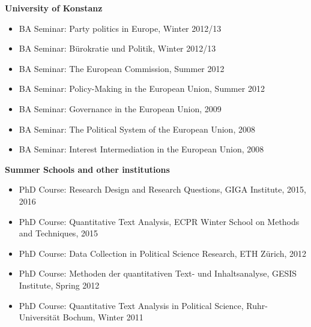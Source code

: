 \textbf{University of Konstanz}
\begin{itemize}[topsep=0pt, noitemsep, leftmargin=3]
	\item BA Seminar: Party politics in Europe, Winter 2012/13
	\item BA Seminar: Bürokratie und Politik, Winter 2012/13
	\item BA Seminar: The European Commission, Summer 2012
	\item BA Seminar: Policy-Making in the European Union, Summer 2012
	\item BA Seminar: Governance in the European Union, 2009
	\item BA Seminar: The Political System of the European Union, 2008
	\item BA Seminar: Interest Intermediation in the European Union, 2008
\end{itemize}

\vspace{\baselineskip}

\textbf{Summer Schools and other institutions}
\begin{itemize}[topsep=0pt, noitemsep, leftmargin=3]
	\item PhD Course: Research Design and Research Questions, GIGA Institute, 2015, 2016
	\item PhD Course: Quantitative Text Analysis, ECPR Winter School on Methods and Techniques, 2015
	\item PhD Course: Data Collection in Political Science Research, ETH Zürich, 2012
	\item PhD Course: Methoden der quantitativen Text- und Inhaltsanalyse, GESIS Institute, Spring 2012
	\item PhD Course: Quantitative Text Analysis in Political Science, Ruhr-Universit\"at Bochum,  Winter 2011
\end{itemize}

